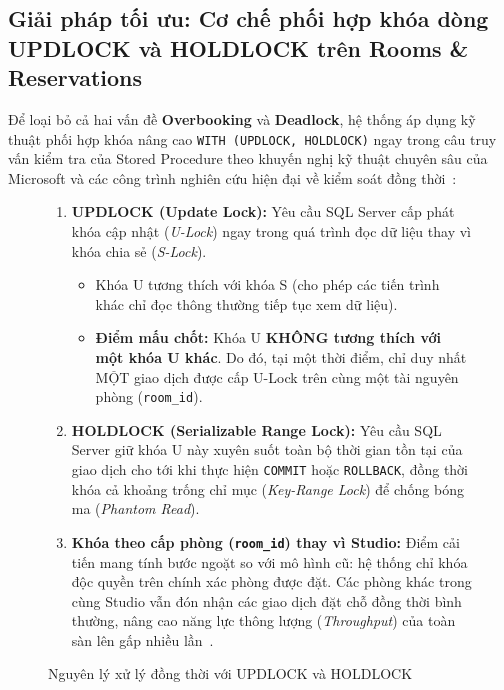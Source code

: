 \subsection{Giải pháp tối ưu: Cơ chế phối hợp khóa dòng UPDLOCK và HOLDLOCK trên Rooms \& Reservations}
Để loại bỏ cả hai vấn đề \textbf{Overbooking} và \textbf{Deadlock}, hệ thống áp dụng kỹ thuật phối hợp khóa nâng cao \texttt{WITH (UPDLOCK, HOLDLOCK)} ngay trong câu truy vấn kiểm tra của Stored Procedure theo khuyến nghị kỹ thuật chuyên sâu của Microsoft và các công trình nghiên cứu hiện đại về kiểm soát đồng thời~\cite{zhang2023adaptive, microsoft2024locking}:

\begin{figure}[H]
\centering
\begin{tcolorbox}[colback=yellow!5!white,colframe=orange!85!black,title=\textbf{NGUYÊN LÝ HOẠT ĐỘNG CỦA CẶP KHÓA UPDLOCK, HOLDLOCK THEO ROOM\_ID}]
\begin{enumerate}[leftmargin=1.5em]
    \item \textbf{UPDLOCK (Update Lock):} Yêu cầu SQL Server cấp phát khóa cập nhật (\textit{U-Lock}) ngay trong quá trình đọc dữ liệu thay vì khóa chia sẻ (\textit{S-Lock}). 
    \begin{itemize}
        \item Khóa U tương thích với khóa S (cho phép các tiến trình khác chỉ đọc thông thường tiếp tục xem dữ liệu).
        \item \textbf{Điểm mấu chốt:} Khóa U \textbf{KHÔNG tương thích với một khóa U khác}. Do đó, tại một thời điểm, chỉ duy nhất MỘT giao dịch được cấp U-Lock trên cùng một tài nguyên phòng (\texttt{room\_id}).
    \end{itemize}
    \item \textbf{HOLDLOCK (Serializable Range Lock):} Yêu cầu SQL Server giữ khóa U này xuyên suốt toàn bộ thời gian tồn tại của giao dịch cho tới khi thực hiện \texttt{COMMIT} hoặc \texttt{ROLLBACK}, đồng thời khóa cả khoảng trống chỉ mục (\textit{Key-Range Lock}) để chống bóng ma (\textit{Phantom Read}).
    \item \textbf{Khóa theo cấp phòng (\texttt{room\_id}) thay vì Studio:} Điểm cải tiến mang tính bước ngoặt so với mô hình cũ: hệ thống chỉ khóa độc quyền trên chính xác phòng được đặt. Các phòng khác trong cùng Studio vẫn đón nhận các giao dịch đặt chỗ đồng thời bình thường, nâng cao năng lực thông lượng (\textit{Throughput}) của toàn sàn lên gấp nhiều lần~\cite{habibi2024towards}.
\end{enumerate}
\end{tcolorbox}
\caption{Nguyên lý xử lý đồng thời với UPDLOCK và HOLDLOCK}
\end{figure}

